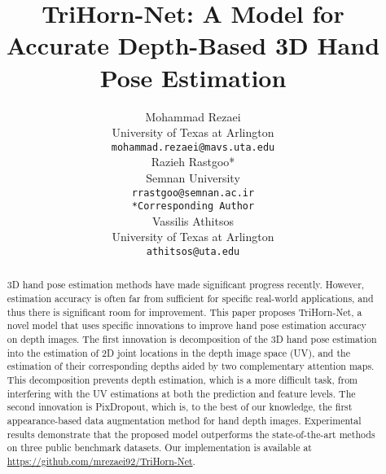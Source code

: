 \documentclass{article}
\title{TriHorn-Net: A Model for Accurate Depth-Based 3D Hand Pose Estimation}
\author{
  Mohammad Rezaei \\
  University of Texas at Arlington\\
  \texttt{mohammad.rezaei@mavs.uta.edu} \\
\And
  Razieh Rastgoo* \\
  Semnan University \\
  \texttt{rrastgoo@semnan.ac.ir} \\
  \texttt{*Corresponding Author}\\
   \And
  Vassilis Athitsos \\
  University of Texas at Arlington\\
  \texttt{athitsos@uta.edu} \\ 
}
\begin{document}
\maketitle

\begin{abstract}
3D hand pose estimation methods have made significant progress recently. However, estimation accuracy is often far from sufficient for specific real-world applications, and thus there is significant room for improvement. This paper proposes TriHorn-Net, a novel model that uses specific innovations to improve hand pose estimation accuracy on depth images. The first innovation is decomposition of the 3D hand pose estimation into the estimation of 2D joint locations in the depth image space (UV), and the estimation of their corresponding depths aided by two complementary attention maps. This decomposition prevents depth estimation, which is a more difficult task, from interfering with the UV estimations at both the prediction and feature levels. The second innovation is PixDropout, which is, to the best of our knowledge, the first appearance-based data augmentation method for hand depth images. Experimental results demonstrate that the proposed model outperforms the state-of-the-art methods on three public benchmark datasets. Our implementation is available at \url{https://github.com/mrezaei92/TriHorn-Net}.
\end{abstract}
\end{document}
